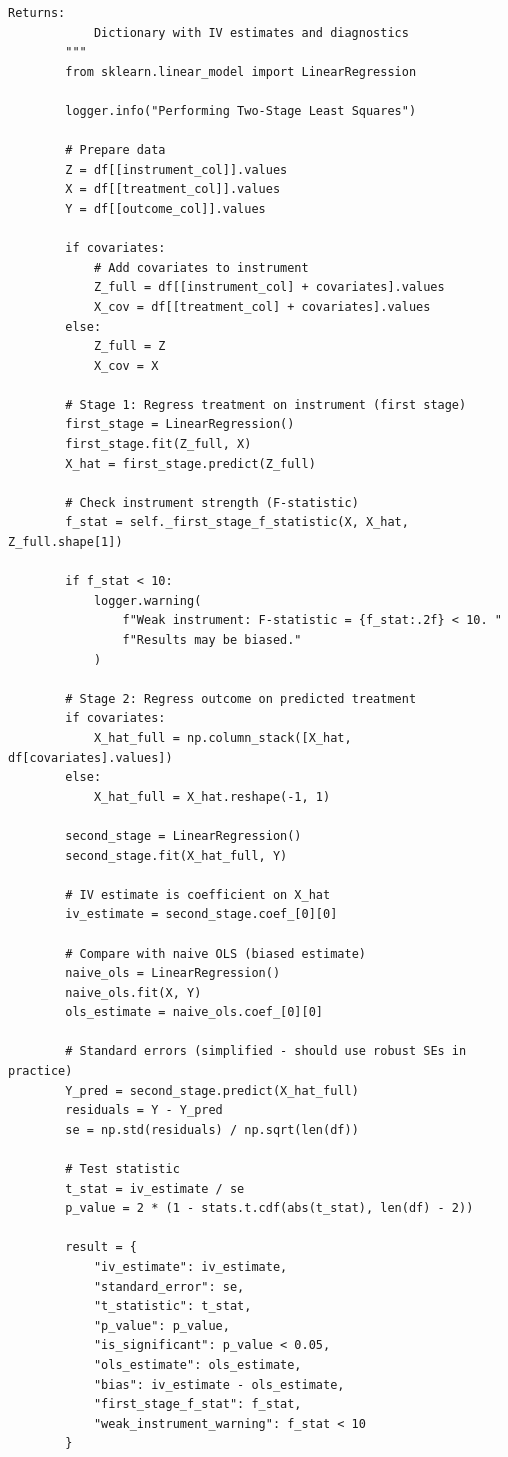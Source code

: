 \begin{lstlisting}[style=python, caption={DAG-based causal inference with backdoor criterion}]
        Returns:
            Dictionary with IV estimates and diagnostics
        """
        from sklearn.linear_model import LinearRegression

        logger.info("Performing Two-Stage Least Squares")

        # Prepare data
        Z = df[[instrument_col]].values
        X = df[[treatment_col]].values
        Y = df[[outcome_col]].values

        if covariates:
            # Add covariates to instrument
            Z_full = df[[instrument_col] + covariates].values
            X_cov = df[[treatment_col] + covariates].values
        else:
            Z_full = Z
            X_cov = X

        # Stage 1: Regress treatment on instrument (first stage)
        first_stage = LinearRegression()
        first_stage.fit(Z_full, X)
        X_hat = first_stage.predict(Z_full)

        # Check instrument strength (F-statistic)
        f_stat = self._first_stage_f_statistic(X, X_hat, Z_full.shape[1])

        if f_stat < 10:
            logger.warning(
                f"Weak instrument: F-statistic = {f_stat:.2f} < 10. "
                f"Results may be biased."
            )

        # Stage 2: Regress outcome on predicted treatment
        if covariates:
            X_hat_full = np.column_stack([X_hat, df[covariates].values])
        else:
            X_hat_full = X_hat.reshape(-1, 1)

        second_stage = LinearRegression()
        second_stage.fit(X_hat_full, Y)

        # IV estimate is coefficient on X_hat
        iv_estimate = second_stage.coef_[0][0]

        # Compare with naive OLS (biased estimate)
        naive_ols = LinearRegression()
        naive_ols.fit(X, Y)
        ols_estimate = naive_ols.coef_[0][0]

        # Standard errors (simplified - should use robust SEs in practice)
        Y_pred = second_stage.predict(X_hat_full)
        residuals = Y - Y_pred
        se = np.std(residuals) / np.sqrt(len(df))

        # Test statistic
        t_stat = iv_estimate / se
        p_value = 2 * (1 - stats.t.cdf(abs(t_stat), len(df) - 2))

        result = {
            "iv_estimate": iv_estimate,
            "standard_error": se,
            "t_statistic": t_stat,
            "p_value": p_value,
            "is_significant": p_value < 0.05,
            "ols_estimate": ols_estimate,
            "bias": iv_estimate - ols_estimate,
            "first_stage_f_stat": f_stat,
            "weak_instrument_warning": f_stat < 10
        }


\end{lstlisting}
